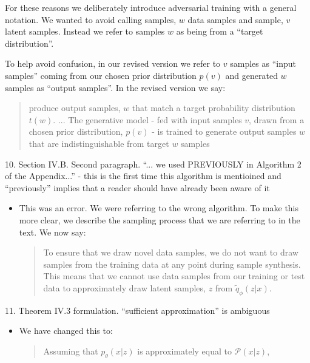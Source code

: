 \documentclass{article}
\begin{document}
For these reasons we deliberately introduce adversarial training with a general notation. We wanted to avoid calling samples, $w$ data samples and sample, $v$ latent samples. Instead we refer to samples $w$ as being from a ``target distribution''.

To help avoid confusion, in our revised version we refer to $v$ samples as ``input samples'' coming from our chosen prior distribution $p(v)$ and generated $w$ samples as ``output samples''. In the revised version we say:
    
    \begin{quote}
        produce output samples, $w$ that match a target probability distribution $t(w)$. \newline ... \newline
        The generative model - fed with input samples $v$, drawn from a chosen prior distribution, $p(v)$ - is trained to generate output samples $w$ that are indistinguishable from target $w$ samples  
    \end{quote}


{\color{blue}
10. Section IV.B. Second paragraph. ``... we used PREVIOUSLY in Algorithm 2 of the Appendix...'' - this is the first time this algorithm is mentioined and ``previously'' implies that a reader should have already been aware of it}
\begin{itemize}
    \item This was an error. We were referring to the wrong algorithm. To make this more clear, we describe the sampling process that we are referring to in the text. We now say:
    \begin{quote}
        To ensure that we draw novel data samples, we do not want to draw samples from the training data at any point during sample synthesis. This means that we cannot use data samples from our training or test data to approximately draw latent samples, $z$ from $\tilde{q}_\phi(z|x)$.
    \end{quote} 
\end{itemize}

{\color{blue}
11. Theorem IV.3 formulation. ``sufficient approximation'' is ambiguous}
\begin{itemize}
    \item We have changed this to:
    \begin{quote}
        Assuming that $p_\theta(x|z)$ is approximately equal to $\mathcal{P}(x|z)$,
    \end{quote}
\end{itemize}
\end{document}
